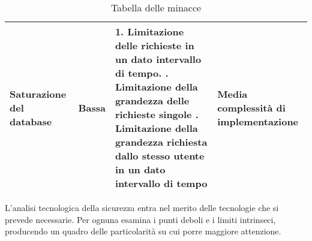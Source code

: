 \begin{table}[htbp]
\begin{tabular} {|P{3cm}|P{2cm}|P{6.1cm}|P{4cm}|}
        \hline
        Saturazione del database                          & Bassa            & 1. Limitazione delle richieste in un dato intervallo di tempo. . Limitazione della grandezza delle richieste singole . Limitazione della grandezza richiesta dallo stesso utente in un dato intervallo di tempo & Media complessità di implementazione                              \\
        \hline
    \end{tabular}

    \caption{Tabella delle minacce}
    \label{<label>}
\end{table}

\clearpage

L'analisi tecnologica della sicurezza entra nel merito delle tecnologie che si prevede necessarie.
Per ognuna esamina i punti deboli e i limiti intrinseci, 
producendo un quadro delle particolarità su cui porre maggiore attenzione.\\
\\


